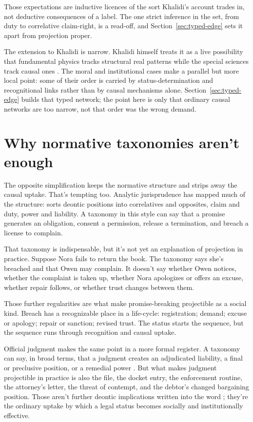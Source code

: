 \documentclass[12pt]{article}
\begin{document}
Those expectations are inductive licences of the sort Khalidi's account trades in, not deductive consequences of a label. The one strict inference in the set, from duty to correlative claim-right, is a read-off, and Section~\ref{sec:typed-edge} sets it apart from projection proper.

The extension to Khalidi is narrow. Khalidi himself treats it as a live possibility that fundamental physics tracks structural real patterns while the special sciences track causal ones \citep[pp.~211--212]{khalidi2013}. The moral and institutional cases make a parallel but more local point: some of their order is carried by status-determination and recognitional links rather than by causal mechanisms alone. Section~\ref{sec:typed-edge} builds that typed network; the point here is only that ordinary causal networks are too narrow, not that order was the wrong demand.

\section{Why normative taxonomies aren't enough}
\label{sec:normative-not-enough}

The opposite simplification keeps the normative structure and strips away the causal uptake. That's tempting too. Analytic jurisprudence has mapped much of the structure: \textcite{hohfeld1913SomeFundamental} sorts deontic positions into correlatives and opposites, claim and duty, power and liability. A taxonomy in this style can say that a promise generates an obligation, consent a permission, release a termination, and breach a license to complain.

That taxonomy is indispensable, but it's not yet an explanation of projection in practice. Suppose Nora fails to return the book. The taxonomy says she's breached and that Owen may complain. It doesn't say whether Owen notices, whether the complaint is taken up, whether Nora apologizes or offers an excuse, whether repair follows, or whether trust changes between them.

Those further regularities are what make promise-breaking projectible as a social kind. Breach has a recognizable place in a life-cycle: registration; demand; excuse or apology; repair or sanction; revised trust. The status starts the sequence, but the sequence runs through recognition and causal uptake.

Official judgment makes the same point in a more formal register. A taxonomy can say, in broad terms, that a judgment creates an adjudicated liability, a final or preclusive position, or a remedial power \citep[\S\S~17--19, 24, 27]{americanLawInstitute1982RestatementJudgments}. But what makes judgment projectible in practice is also the file, the docket entry, the enforcement routine, the attorney's letter, the threat of contempt, and the debtor's changed bargaining position. Those aren't further deontic implications written into the word ; they're the ordinary uptake by which a legal status becomes socially and institutionally effective.
\end{document}
